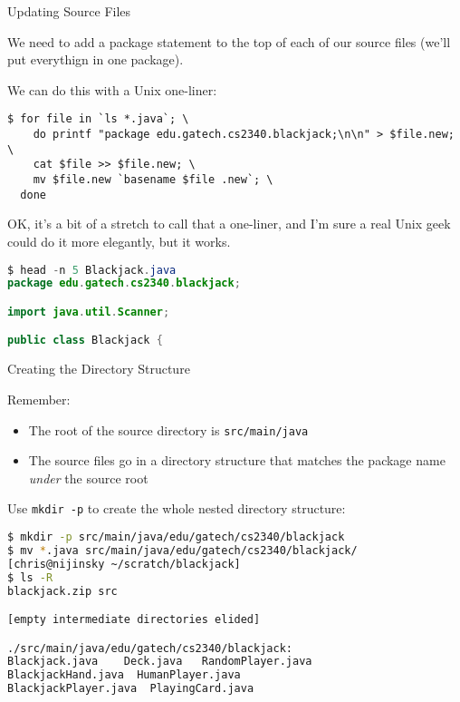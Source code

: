 \documentclass{beamer}
\begin{document}
\begin{frame}[fragile]{Updating Source Files}

We need to add a package statement to the top of each of our source files (we'll put everythign in one package).

We can do this with a Unix one-liner:
\begin{lstlisting}[langauge=bash]
$ for file in `ls *.java`; \
    do printf "package edu.gatech.cs2340.blackjack;\n\n" > $file.new; \
    cat $file >> $file.new; \
    mv $file.new `basename $file .new`; \
  done
\end{lstlisting}
OK, it's a bit of a stretch to call that a one-liner, and I'm sure a real Unix geek could do it more elegantly, but it works.

\begin{lstlisting}[language=Java]
$ head -n 5 Blackjack.java
package edu.gatech.cs2340.blackjack;

import java.util.Scanner;

public class Blackjack {
\end{lstlisting}

\end{frame}

\begin{frame}[fragile]{Creating the Directory Structure}

Remember:
\begin{itemize}
\item The root of the source directory is {\tt src/main/java}
\item The source files go in a directory structure that matches the package name {\it under} the source root
\end{itemize}

Use {\tt mkdir -p} to create the whole nested directory structure:
\begin{lstlisting}[language=bash]
$ mkdir -p src/main/java/edu/gatech/cs2340/blackjack
$ mv *.java src/main/java/edu/gatech/cs2340/blackjack/
[chris@nijinsky ~/scratch/blackjack]
$ ls -R
blackjack.zip src

[empty intermediate directories elided]

./src/main/java/edu/gatech/cs2340/blackjack:
Blackjack.java    Deck.java   RandomPlayer.java
BlackjackHand.java  HumanPlayer.java
BlackjackPlayer.java  PlayingCard.java


\end{lstlisting}

\end{frame}
\end{document}
